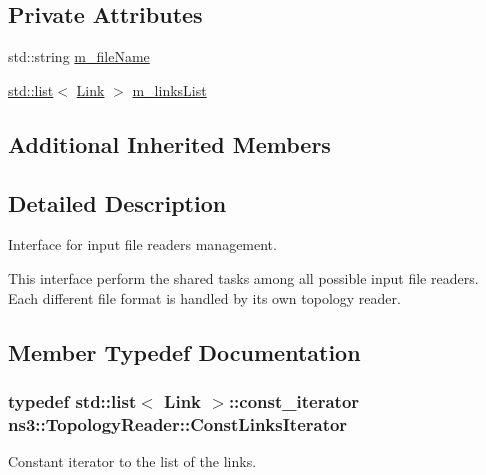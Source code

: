 \subsection*{Private Attributes}
\begin{DoxyCompactItemize}
\item 
std\+::string \hyperlink{classns3_1_1TopologyReader_acd9a455842760483301b053c84d59a94}{m\+\_\+file\+Name}
\item 
\hyperlink{openflow-interface_8h_afd9bcfa176617760671b67580f536fa7}{std\+::list}$<$ \hyperlink{classns3_1_1TopologyReader_1_1Link}{Link} $>$ \hyperlink{classns3_1_1TopologyReader_a03a7e3ab363afdb72a0c62bfbd133b08}{m\+\_\+links\+List}
\end{DoxyCompactItemize}
\subsection*{Additional Inherited Members}


\subsection{Detailed Description}
Interface for input file readers management. 

This interface perform the shared tasks among all possible input file readers. Each different file format is handled by its own topology reader. 

\subsection{Member Typedef Documentation}
\subsubsection[{\texorpdfstring{Const\+Links\+Iterator}{ConstLinksIterator}}]{\setlength{\rightskip}{0pt plus 5cm}typedef {\bf std\+::list}$<$ {\bf Link} $>$\+::const\+\_\+iterator {\bf ns3\+::\+Topology\+Reader\+::\+Const\+Links\+Iterator}}\hypertarget{classns3_1_1TopologyReader_a13f936af0da10bb38b80bd23048bbe20}{}\label{classns3_1_1TopologyReader_a13f936af0da10bb38b80bd23048bbe20}


Constant iterator to the list of the links. 



